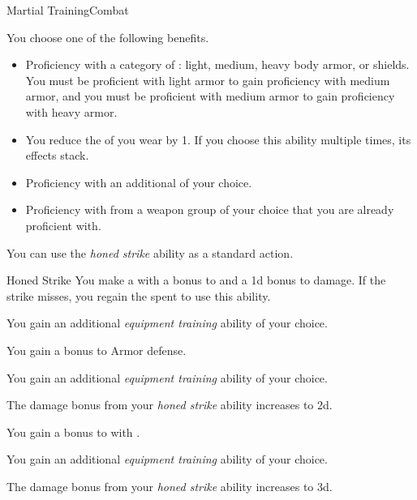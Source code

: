     \begin{feat}{Martial Training}{Combat}

         You choose one of the following benefits.
        \begin{itemize}
            \item Proficiency with a category of : light, medium, heavy body armor, or shields.
                You must be proficient with light armor to gain proficiency with medium armor, and you must be proficient with medium armor to gain proficiency with heavy armor.
            \item You reduce the  of  you wear by 1.
                If you choose this ability multiple times, its effects stack.
            \item Proficiency with an additional  of your choice.
            \item Proficiency with  from a weapon group of your choice that you are already proficient with.
        \end{itemize}

         You can use the \textit{honed strike} ability as a standard action.
        \begin{apability}{Honed Strike}
            You make a  with a  bonus to  and a \plus1d bonus to damage.
            If the strike misses, you regain the  spent to use this ability.
        \end{apability}

         You gain an additional \textit{equipment training} ability of your choice.

         You gain a  bonus to Armor defense.

         You gain an additional \textit{equipment training} ability of your choice.

         The damage bonus from your \textit{honed strike} ability increases to \plus2d.

         You gain a  bonus to  with .

         You gain an additional \textit{equipment training} ability of your choice.

         The damage bonus from your \textit{honed strike} ability increases to \plus3d.
    \end{feat}

